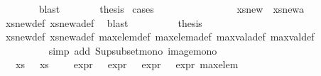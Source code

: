 \begin{isabellebody}
\ \ \ \ \ \ \isamarkupfalse%
\ blast\isanewline
\ \ \ \ \isamarkupfalse%
\ \isamarkupfalse%
\ {\isacharquery}{\kern0pt}thesis\ \isamarkupfalse%
{\isacharparenleft}{\kern0pt}cases{\isacharparenright}{\kern0pt}\isanewline
\ \ \ \ \ \ \isamarkupfalse%
\ {}\isanewline
\ \ \ \ \ \ \isamarkupfalse%
\ {\isachardoublequoteopen}xs{\isacharunderscore}{\kern0pt}new\ {\isasymsubseteq}\ xs{\isacharunderscore}{\kern0pt}new{\isacharunderscore}{\kern0pt}a{\isachardoublequoteclose}\isanewline
\ \ \ \ \ \ \ \ \isamarkupfalse%
\ xs{\isacharunderscore}{\kern0pt}new{\isacharunderscore}{\kern0pt}def\ xs{\isacharunderscore}{\kern0pt}new{\isacharunderscore}{\kern0pt}a{\isacharunderscore}{\kern0pt}def\ \isamarkupfalse%
\ blast\isanewline
\ \ \ \ \ \ \isamarkupfalse%
\ \isamarkupfalse%
\ {\isacharquery}{\kern0pt}thesis\isanewline
\ \ \ \ \ \ \ \ \isamarkupfalse%
\ xs{\isacharunderscore}{\kern0pt}new{\isacharunderscore}{\kern0pt}def\ xs{\isacharunderscore}{\kern0pt}new{\isacharunderscore}{\kern0pt}a{\isacharunderscore}{\kern0pt}def\ max{\isacharunderscore}{\kern0pt}elem{\isacharunderscore}{\kern0pt}def\ max{\isacharunderscore}{\kern0pt}elem{\isacharunderscore}{\kern0pt}a{\isacharunderscore}{\kern0pt}def\ max{\isacharunderscore}{\kern0pt}val{\isacharunderscore}{\kern0pt}a{\isacharunderscore}{\kern0pt}def\ max{\isacharunderscore}{\kern0pt}val{\isacharunderscore}{\kern0pt}def\ \isanewline
\ \ \ \ \ \ \ \ \isamarkupfalse%
\ {\isacharparenleft}{\kern0pt}simp\ add{\isacharcolon}{\kern0pt}\ Sup{\isacharunderscore}{\kern0pt}subset{\isacharunderscore}{\kern0pt}mono\ image{\isacharunderscore}{\kern0pt}mono{\isacharparenright}{\kern0pt}\isanewline
\ \ \ \ \isamarkupfalse%
\isanewline
\ \ \ \ \ \ \isamarkupfalse%
\ {}\isanewline
\ \ \ \ \ \ \isamarkupfalse%
\ {\isachardoublequoteopen}{\isasymexists}{\isasymphi}\ {\isasymin}\ xs{\isachardot}{\kern0pt}\ {\isasymexists}{\isasympsi}\ {\isasymin}\ xs{\isachardot}{\kern0pt}\ {\isasymphi}\ {\isasymnoteq}\ {\isasympsi}\ {\isasymand}\ expr{\isacharunderscore}{\kern0pt}{}\ {\isasymphi}\ {\isacharequal}{\kern0pt}\ expr{\isacharunderscore}{\kern0pt}{}\ {\isasympsi}\ {\isasymand}\ expr{\isacharunderscore}{\kern0pt}{}\ {\isasympsi}\ {\isacharequal}{\kern0pt}\ expr{\isacharunderscore}{\kern0pt}{}\ max{\isacharunderscore}{\kern0pt}elem{\isachardoublequoteclose}\isanewline

\end{isabellebody}

